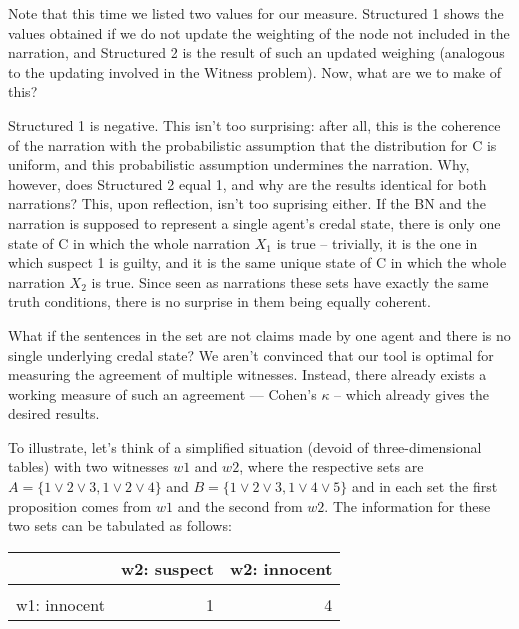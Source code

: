 \documentclass[10pt,]{scrartcl}
\begin{document}
Note that this time we listed two values for our measure.
\textsf{Structured 1} shows the values obtained if we do not update the
weighting of the node not included in the narration, and
\textsf{Structured 2} is the result of such an updated weighing
(analogous to the updating involved in the \textsf{Witness} problem).
Now, what are we to make of this?

\textsf{Structured 1} is negative. This isn't too surprising: after all,
this is the coherence of the narration with the probabilistic assumption
that the distribution for \textsf{C} is uniform, and this probabilistic
assumption undermines the narration. Why, however, does
\textsf{Structured 2} equal 1, and why are the results identical for
both narrations? This, upon reflection, isn't too suprising either. If
the BN and the narration is supposed to represent a single agent's
credal state, there is only one state of \textsf{C} in which the whole
narration \(X_1\) is true -- trivially, it is the one in which suspect 1
is guilty, and it is the same unique state of \textsf{C} in which the
whole narration \(X_2\) is true. Since seen as narrations these sets
have exactly the same truth conditions, there is no surprise in them
being equally coherent.

What if the sentences in the set are not claims made by one agent and
there is no single underlying credal state? We aren't convinced that our
tool is optimal for measuring the agreement of multiple witnesses.
Instead, there already exists a working measure of such an agreement ---
Cohen's \(\kappa\) -- which already gives the desired results.

To illustrate, let's think of a simplified situation (devoid of
three-dimensional tables) with two witnesses \(w1\) and \(w2\), where
the respective sets are \(A = \{1 \vee 2 \vee 3, 1\vee 2 \vee 4\}\) and
\(B = \{1 \vee 2 \vee 3, 1\vee 4 \vee 5\}\) and in each set the first
proposition comes from \(w1\) and the second from \(w2\). The
information for these two sets can be tabulated as follows:

\begin{table}[H]
\centering
\begin{tabular}{lrr}
\toprule
  & w2: suspect & w2: innocent\\
\midrule
\cellcolor{gray!6}{w1:suspect} & \cellcolor{gray!6}{2} & \cellcolor{gray!6}{1}\\
w1: innocent & 1 & 4\\
\bottomrule
\end{tabular}
\end{table}
\end{document}
